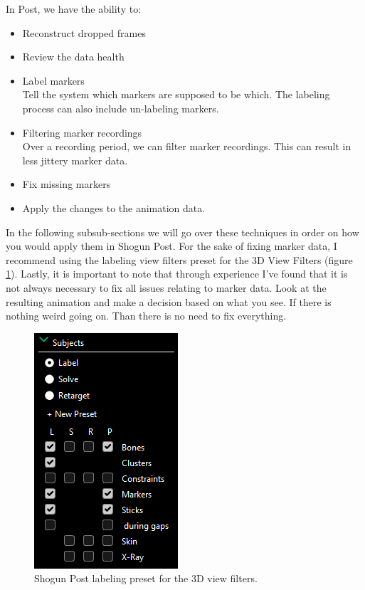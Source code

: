 \documentclass{uva-inf-article}
\begin{document}
In Post, we have the ability to:
\begin{itemize}
    \item Reconstruct dropped frames
    \item Review the data health
    \item Label markers\\Tell the system which markers are supposed to be which. The labeling process can also include un-labeling markers.
    \item Filtering marker recordings\\Over a recording period, we can filter marker recordings. This can result in less jittery marker data.
    \item Fix missing markers
    \item Apply the changes to the animation data.
\end{itemize}

In the following subsub-sections we will go over these techniques in order on how you would apply them in Shogun Post. For the sake of fixing marker data, I recommend using the labeling view filters preset for the 3D View Filters (figure \ref{fig:viewfilters}). Lastly, it is important to note that through experience I've found that it is not always necessary to fix all issues relating to marker data. Look at the resulting animation and make a decision based on what you see. If there is nothing weird going on. Than there is no need to fix everything.

\begin{figure}[hbt!]
    \centering
    \includegraphics[width=0.1\textheight]{imgs/viewFilters.png}
    \caption{Shogun Post labeling preset for the 3D view filters.}
    \label{fig:viewfilters}
\end{figure}
\end{document}
